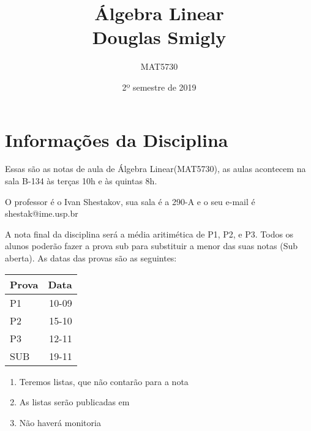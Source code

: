 \documentclass[11pt,twoside,a4paper]{book}
\title{Álgebra Linear \\  Douglas Smigly}
\author{MAT5730}
\date{2º semestre de 2019}
\begin{document}
\maketitle
\newpage
\tableofcontents
\newpage
\chapter*{Informações da Disciplina}
\label{sec:intro}
\label{new-question}

Essas são as notas de aula de Álgebra Linear(MAT5730), as aulas acontecem na sala B-134 às terças 10h e às quintas 8h.



O professor é o Ivan Shestakov, sua sala é a 290-A e o seu e-mail é shestak@ime.usp.br

\nocite{*}



A nota final da disciplina será a média aritimética de P1, P2, e P3. Todos os
alunos poderão fazer a prova sub para substituir a menor das suas notas (Sub
aberta). As datas das provas são as seguintes:

\begin{table}[h!]
  \begin{center}
    
    \label{tab:table1}
    \begin{tabular}{l|r} %
      \textbf{Prova} & \textbf{Data}\\
      \hline
      P1 & 10-09\\
      P2 & 15-10\\
      P3 & 12-11\\
      SUB & 19-11
    \end{tabular}
  \end{center}
\end{table}

\begin{enumerate}[label=(\roman*)]
\item Teremos listas, que não contarão para a nota
\item As listas serão publicadas em 
\item Não haverá monitoria
\end{enumerate}
\newpage 
\end{document}
